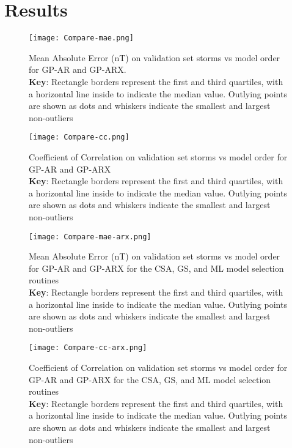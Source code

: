 \section{Results}\label{sec:res}

\begin{figure}
    \noindent\texttt{[image: Compare-mae.png]}
    \caption{Mean Absolute Error (\si{\nano\tesla}) on validation set storms vs model order for GP-AR and GP-ARX. \\ \textbf{Key}: Rectangle borders represent the first and third quartiles, with a horizontal line inside to indicate the median value. Outlying points are shown as dots and whiskers indicate the smallest and largest non-outliers}
    \label{fig:CompareMae}
\end{figure}
    
\begin{figure}
    \noindent\texttt{[image: Compare-cc.png]}
    \caption{Coefficient of Correlation on validation set storms vs model order for GP-AR and GP-ARX \\ \textbf{Key}: Rectangle borders represent the first and third quartiles, with a horizontal line inside to indicate the median value. Outlying points are shown as dots and whiskers indicate the smallest and largest non-outliers}
    \label{fig:CompareCC}
\end{figure}
    
    
\begin{figure}
    \noindent\texttt{[image: Compare-mae-arx.png]}
    \caption{Mean Absolute Error (\si{\nano\tesla}) on validation set storms vs model order for 
    GP-AR and GP-ARX for the CSA, GS, and ML model selection routines \\ 
    \textbf{Key}: Rectangle borders represent the first and third quartiles, with a horizontal line 
    inside to indicate the median value. Outlying points are shown as dots and whiskers indicate 
    the smallest and largest non-outliers}
    \label{fig:CompareMaeARX}
\end{figure}
    
\begin{figure}
    \noindent\texttt{[image: Compare-cc-arx.png]}
    \caption{Coefficient of Correlation on validation set storms vs model order for GP-AR and 
    GP-ARX for the CSA, GS, and ML model selection routines \\ 
    \textbf{Key}: Rectangle borders represent the first and third quartiles, with a horizontal line 
    inside to indicate the median value. Outlying points are shown as dots and whiskers indicate 
    the smallest and largest non-outliers}
    \label{fig:CompareCCARX}
\end{figure}
    

